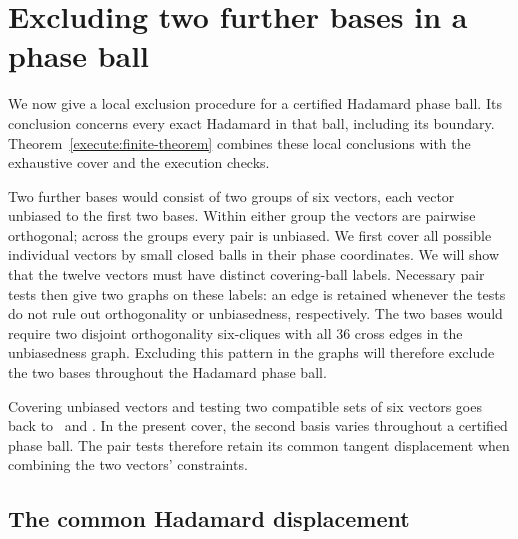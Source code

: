\section{Excluding two further bases in a phase ball}
\label{sec:exclusion}

We now give a local exclusion procedure for a certified Hadamard phase
ball.  Its conclusion concerns every exact Hadamard in that ball,
including its boundary. Theorem~\ref{execute:finite-theorem} combines
these local conclusions with the exhaustive cover and the execution checks.

Two further bases would consist of two groups of six vectors, each vector
unbiased to the first two bases. Within either group the vectors are
pairwise orthogonal; across the groups every pair is unbiased. We first
cover all possible individual vectors by small closed balls in their
phase coordinates. We will show that the twelve vectors must have
distinct covering-ball labels. Necessary pair tests then give two graphs
on these labels: an edge is retained whenever the tests do not rule out
orthogonality or unbiasedness, respectively. The two bases would require
two disjoint orthogonality six-cliques with all $36$ cross edges in the
unbiasedness graph. Excluding this pattern in the graphs will therefore
exclude the two bases throughout the Hadamard phase ball.

Covering unbiased vectors and testing two compatible sets of six
vectors goes back to~\cite[Section~3]{JamingEtAl2009} and
\cite[Sections~2--4]{JamingMatolcsiMora2010}. In the present cover, the
second basis varies throughout a certified phase ball. The pair tests
therefore retain its common tangent displacement when combining the two
vectors' constraints.

\subsection{The common Hadamard displacement}

